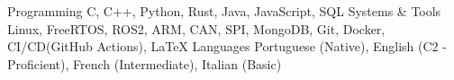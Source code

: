 
\begin{cvskills}

  \cvskill
    {Programming}
    {C, C++, Python, Rust, Java, JavaScript, SQL}
  \cvskill
    {Systems \& Tools} 
    {Linux, FreeRTOS, ROS2, ARM, CAN, SPI, MongoDB, Git, Docker, CI/CD(GitHub Actions), LaTeX}
  \cvskill
    {Languages} 
    {Portuguese (Native), English (C2 - Proficient), French (Intermediate), Italian (Basic)} 

\end{cvskills}
